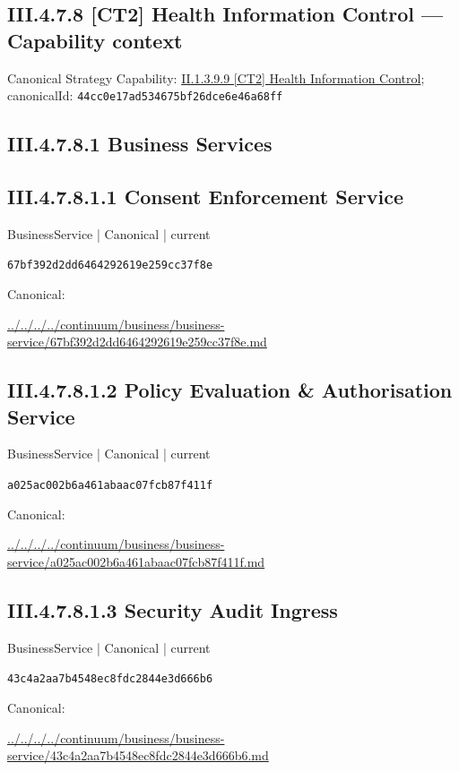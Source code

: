 \documentclass[10pt,a4paper]{article}
\begin{document}
\subsection*{III.4.7.8 [CT2] Health Information Control — Capability context}
Canonical Strategy Capability: \hyperref[element-44cc0e17ad534675bf26dce6e46a68ff]{II.1.3.9.9 [CT2] Health Information Control}; canonicalId: \texttt{44cc0e17ad534675bf26dce6e46a68ff}\par
\subsection*{III.4.7.8.1 Business Services}
\subsection*{III.4.7.8.1.1 Consent Enforcement Service}
\label{element-67bf392d2dd6464292619e259cc37f8e}
{\small BusinessService | Canonical | current}\par
\texttt{67bf392d2dd6464292619e259cc37f8e}\par
Canonical: \par
{\footnotesize\url{../../../../continuum/business/business-service/67bf392d2dd6464292619e259cc37f8e.md}}\par
\subsection*{III.4.7.8.1.2 Policy Evaluation \& Authorisation Service}
\label{element-a025ac002b6a461abaac07fcb87f411f}
{\small BusinessService | Canonical | current}\par
\texttt{a025ac002b6a461abaac07fcb87f411f}\par
Canonical: \par
{\footnotesize\url{../../../../continuum/business/business-service/a025ac002b6a461abaac07fcb87f411f.md}}\par
\subsection*{III.4.7.8.1.3 Security Audit Ingress}
\label{element-43c4a2aa7b4548ec8fdc2844e3d666b6}
{\small BusinessService | Canonical | current}\par
\texttt{43c4a2aa7b4548ec8fdc2844e3d666b6}\par
Canonical: \par
{\footnotesize\url{../../../../continuum/business/business-service/43c4a2aa7b4548ec8fdc2844e3d666b6.md}}\par
\end{document}
